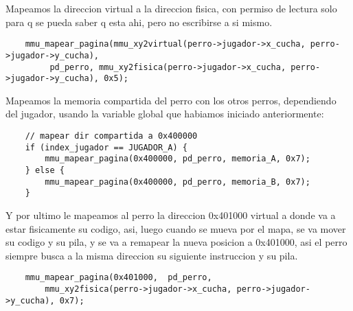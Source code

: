 Mapeamos la direccion virtual a la direccion fisica, con permiso de lectura solo para q se pueda saber q esta ahi, pero no escribirse a si mismo.
\begin{codesnippet}
\begin{verbatim}
    mmu_mapear_pagina(mmu_xy2virtual(perro->jugador->x_cucha, perro->jugador->y_cucha),
    	 pd_perro, mmu_xy2fisica(perro->jugador->x_cucha, perro->jugador->y_cucha), 0x5);
    \end{verbatim}
\end{codesnippet}

Mapeamos la memoria compartida del perro con los otros perros, dependiendo del jugador, usando la variable global que habiamos iniciado anteriormente:
\begin{codesnippet}
\begin{verbatim}
    // mapear dir compartida a 0x400000
    if (index_jugador == JUGADOR_A) {
        mmu_mapear_pagina(0x400000, pd_perro, memoria_A, 0x7);
    } else {
        mmu_mapear_pagina(0x400000, pd_perro, memoria_B, 0x7);
    }
    \end{verbatim}
\end{codesnippet}


   Y por ultimo le mapeamos al perro la direccion 0x401000 virtual a donde va a estar fisicamente su codigo, asi, luego cuando se mueva por el mapa, se va mover su codigo y su pila, y se va a remapear la nueva posicion a 0x401000, asi el perro siempre busca a la misma direccion su siguiente instruccion y su pila.
   \begin{codesnippet}
\begin{verbatim}
    mmu_mapear_pagina(0x401000,  pd_perro, 
    	mmu_xy2fisica(perro->jugador->x_cucha, perro->jugador->y_cucha), 0x7);
    \end{verbatim}
\end{codesnippet}

